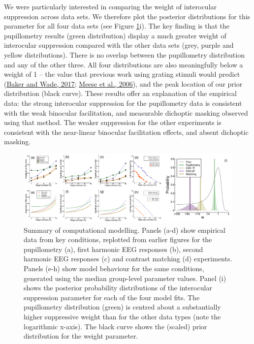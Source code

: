 \documentclass[
]{article}
\begin{document}
We were particularly interested in comparing the weight of interocular suppression across data sets. We therefore plot the posterior distributions for this parameter for all four data sets (see Figure \ref{fig:modelfigure}i). The key finding is that the pupillometry results (green distribution) display a much greater weight of interocular suppression compared with the other data sets (grey, purple and yellow distributions). There is no overlap between the pupillometry distribution and any of the other three. All four distributions are also meaningfully below a weight of 1 -- the value that previous work using grating stimuli would predict (\protect\hyperlink{ref-Baker2017}{Baker and Wade, 2017}; \protect\hyperlink{ref-Meese2006}{Meese et al., 2006}), and the peak location of our prior distribution (black curve). These results offer an explanation of the empirical data: the strong interocular suppression for the pupillometry data is consistent with the weak binocular facilitation, and measurable dichoptic masking observed using that method. The weaker suppression for the other experiments is consistent with the near-linear binocular facilitation effects, and absent dichoptic masking.

\begin{figure}

{\centering \includegraphics{Figures/modelfigure} 

}

\caption{Summary of computational modelling. Panels (a-d) show empirical data from key conditions, replotted from earlier figures for the pupillometry (a), first harmonic EEG responses (b), second harmonic EEG responses (c) and contrast matching (d) experiments. Panels (e-h) show model behaviour for the same conditions, generated using the median group-level parameter values.  Panel (i) shows the posterior probability distributions of the interocular suppression parameter for each of the four model fits. The pupillometry distribution (green) is centred about a substantially higher suppressive weight than for the other data types (note the logarithmic x-axis). The black curve shows the (scaled) prior distribution for the weight parameter.}\label{fig:modelfigure}
\end{figure}
\end{document}

